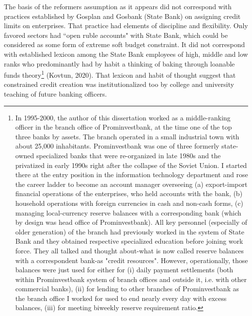 The basis of the reformers assumption as it appears did not correspond with practices established by Gosplan and Gosbank (State Bank) on assigning credit limits on enterprises. That practice had elements of discipline and flexibility. Only favored sectors had ``open ruble accounts" with State Bank, which could be considered as some form of extreme soft budget constraint. It did not correspond with established lexicon among the State Bank employees of high, middle and low ranks who predominantly had by habit a thinking of baking through loanable funds theory\footnote{In 1995-2000, the author of this dissertation worked as a middle-ranking officer in the branch office of Prominvestbank, at the time one of the top three banks by assets. The branch operated in a small industrial town with about 25,000 inhabitants. Prominvestbank was one of three formerly state-owned specialized banks that were re-organized in late 1980s and the privatized in early 1990s right after the collapse of the Soviet Union. I started there at the entry position in the information technology department and rose the career ladder to become an account manager overseeing (a) export-import financial operations of the enterprises, who held accounts with the bank, (b) household operations with foreign currencies in cash and non-cash forms, (c) managing local-currency reserve balances with a corresponding bank (which by design was head office of Prominvestbank). All key personnel (especially of older generation) of the branch had previously worked in the system of State Bank and they obtained respective specialized education before joining work force. They all talked and thought about-what is now called reserve balances with a correspondent bank-as "credit resources". However, operationally, those balances were just used for either for (i) daily payment settlements (both within Prominvestbank system of branch offices and outside it, i.e. with other commercial banks), (ii) for lending to other branches of Prominvestbank as the branch office I worked for used to end nearly every day with excess balances, (iii) for meeting biweekly reserve requirement ratio.} (Kovtun, 2020). That lexicon and habit of thought suggest that constrained credit creation was institutionalized too by college and university teaching of future banking officers.


